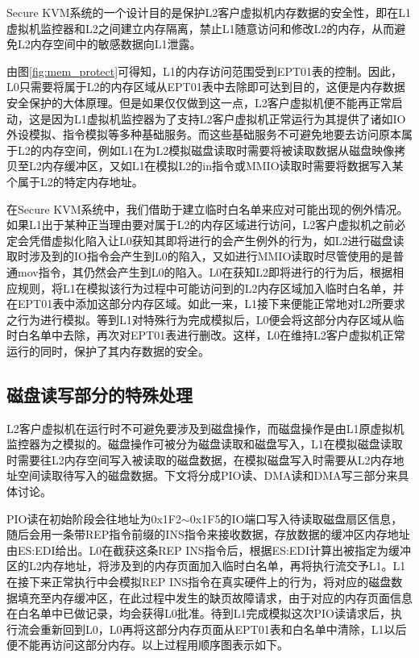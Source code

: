 Secure KVM系统的一个设计目的是保护L2客户虚拟机内存数据的安全性，即在L1虚拟机监控器和L2之间建立内存隔离，禁止L1随意访问和修改L2的内存，从而避免L2内存空间中的敏感数据向L1泄露。

由图\ref{fig:mem_protect}可得知，L1的内存访问范围受到EPT01表的控制。因此，L0只需要将属于L2的内存区域从EPT01表中去除即可达到目的，这便是内存数据安全保护的大体原理。但是如果仅仅做到这一点，L2客户虚拟机便不能再正常启动，这是因为L1虚拟机监控器为了支持L2客户虚拟机正常运行为其提供了诸如IO外设模拟、指令模拟等多种基础服务。而这些基础服务不可避免地要去访问原本属于L2的内存空间，例如L1在为L2模拟磁盘读取时需要将被读取数据从磁盘映像拷贝至L2内存缓冲区，又如L1在模拟L2的in指令或MMIO读取时需要将数据写入某个属于L2的特定内存地址。

在Secure KVM系统中，我们借助于建立临时白名单来应对可能出现的例外情况。如果L1出于某种正当理由要对属于L2的内存区域进行访问，L2客户虚拟机之前必定会凭借虚拟化陷入让L0获知其即将进行的会产生例外的行为，如L2进行磁盘读取时涉及到的IO指令会产生到L0的陷入，又如进行MMIO读取时尽管使用的是普通mov指令，其仍然会产生到L0的陷入。L0在获知L2即将进行的行为后，根据相应规则，将L1在模拟该行为过程中可能访问到的L2内存区域加入临时白名单，并在EPT01表中添加这部分内存区域。如此一来，L1接下来便能正常地对L2所要求之行为进行模拟。等到L1对特殊行为完成模拟后，L0便会将这部分内存区域从临时白名单中去除，再次对EPT01表进行删改。这样，L0在维持L2客户虚拟机正常运行的同时，保护了其内存数据的安全。

\subsection{磁盘读写部分的特殊处理}

L2客户虚拟机在运行时不可避免要涉及到磁盘操作，而磁盘操作是由L1原虚拟机监控器为之模拟的。磁盘操作可被分为磁盘读取和磁盘写入，L1在模拟磁盘读取时需要往L2内存空间写入被读取的磁盘数据，在模拟磁盘写入时需要从L2内存地址空间读取待写入的磁盘数据。下文将分成PIO读、DMA读和DMA写三部分来具体讨论。

PIO读在初始阶段会往地址为0x1F2$\sim$0x1F5的IO端口写入待读取磁盘扇区信息，随后会用一条带REP指令前缀的INS指令来接收数据，存放数据的缓冲区内存地址由ES:EDI给出。L0在截获这条REP INS指令后，根据ES:EDI计算出被指定为缓冲区的L2内存地址，将涉及到的内存页面加入临时白名单，再将执行流交予L1。L1在接下来正常执行中会模拟REP INS指令在真实硬件上的行为，将对应的磁盘数据填充至内存缓冲区，在此过程中发生的缺页故障请求，由于对应的内存页面信息在白名单中已做记录，均会获得L0批准。待到L1完成模拟这次PIO读请求后，执行流会重新回到L0，L0再将这部分内存页面从EPT01表和白名单中清除，L1以后便不能再访问这部分内存。以上过程用顺序图表示如下。

